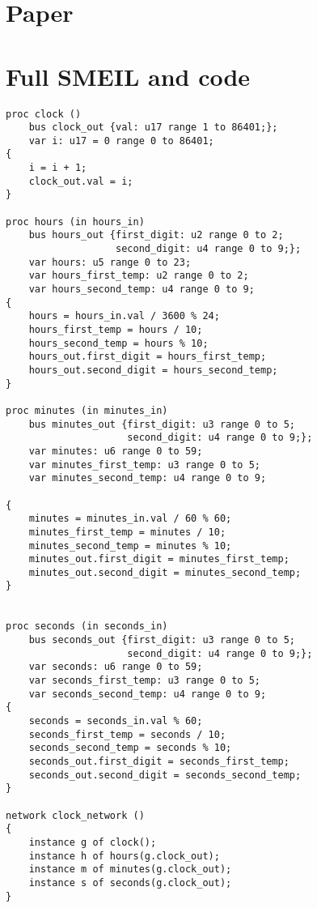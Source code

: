 \appendix
\section{Paper}
\section*{Full SMEIL and \cspm code}
\begin{verbatim}
proc clock ()
    bus clock_out {val: u17 range 1 to 86401;};
    var i: u17 = 0 range 0 to 86401;
{
    i = i + 1;
    clock_out.val = i;
}

proc hours (in hours_in)
    bus hours_out {first_digit: u2 range 0 to 2;
                   second_digit: u4 range 0 to 9;};
    var hours: u5 range 0 to 23;
    var hours_first_temp: u2 range 0 to 2;
    var hours_second_temp: u4 range 0 to 9;
{
    hours = hours_in.val / 3600 % 24;
    hours_first_temp = hours / 10;
    hours_second_temp = hours % 10;
    hours_out.first_digit = hours_first_temp;
    hours_out.second_digit = hours_second_temp;
}

proc minutes (in minutes_in)
    bus minutes_out {first_digit: u3 range 0 to 5;
                     second_digit: u4 range 0 to 9;};
    var minutes: u6 range 0 to 59;
    var minutes_first_temp: u3 range 0 to 5;
    var minutes_second_temp: u4 range 0 to 9;

{
    minutes = minutes_in.val / 60 % 60;
    minutes_first_temp = minutes / 10;
    minutes_second_temp = minutes % 10;
    minutes_out.first_digit = minutes_first_temp;
    minutes_out.second_digit = minutes_second_temp;
}


proc seconds (in seconds_in)
    bus seconds_out {first_digit: u3 range 0 to 5;
                     second_digit: u4 range 0 to 9;};
    var seconds: u6 range 0 to 59;
    var seconds_first_temp: u3 range 0 to 5;
    var seconds_second_temp: u4 range 0 to 9;
{
    seconds = seconds_in.val % 60;
    seconds_first_temp = seconds / 10;
    seconds_second_temp = seconds % 10;
    seconds_out.first_digit = seconds_first_temp;
    seconds_out.second_digit = seconds_second_temp;
}

network clock_network ()
{
    instance g of clock();
    instance h of hours(g.clock_out);
    instance m of minutes(g.clock_out);
    instance s of seconds(g.clock_out);
}

\end{verbatim}

